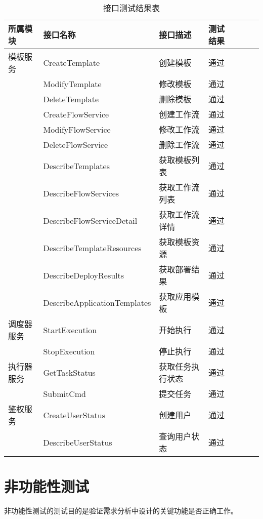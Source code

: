 \begin{table}[H]
    \centering
    \caption{接口测试结果表}
    \label{tab:t_test_result_1}
    \begin{tabular}{lllllll}
        \toprule
        所属模块&   接口名称	& 接口描述  &测试结果 \\
        \midrule
        模板服务&   CreateTemplate	& 创建模板   &   通过\\
        &   ModifyTemplate	& 修改模板   &   通过\\
        &   DeleteTemplate	& 删除模板   &   通过\\
        &   CreateFlowService	& 创建工作流   &   通过\\
        &   ModifyFlowService	& 修改工作流   &   通过\\
        &   DeleteFlowService	& 删除工作流   &   通过\\
        &   DescribeTemplates	& 获取模板列表   &   通过\\
        &   DescribeFlowServices	& 获取工作流列表   &   通过\\
        &   DescribeFlowServiceDetail	& 获取工作流详情   &   通过\\
        &   DescribeTemplateResources	& 获取模板资源   &   通过\\
        &   DescribeDeployResults	& 获取部署结果   &   通过\\
        &   DescribeApplicationTemplates	& 获取应用模板   &   通过\\
        调度器服务&   StartExecution	& 开始执行   &   通过\\
        &   StopExecution	& 停止执行   &   通过\\
        执行器服务&   GetTaskStatus	& 获取任务执行状态   &   通过\\
        &   SubmitCmd	& 提交任务   &   通过\\
        鉴权服务&   CreateUserStatus	& 创建用户   &   通过\\
        &   DescribeUserStatus	& 查询用户状态   &   通过\\
        \bottomrule
    \end{tabular}
\end{table}



\section{非功能性测试}


非功能性测试的测试目的是验证需求分析中设计的关键功能是否正确工作。

